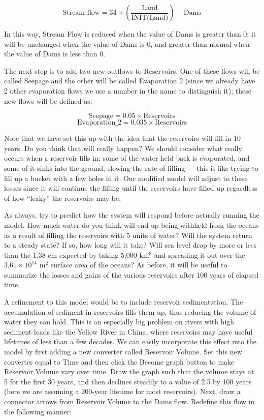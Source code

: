 \documentclass[11pt,letterpaper]{article}
\begin{document}
$$\mbox{Stream flow}=34\times\left(\frac{\mbox{Land}}{\mbox{INIT(Land)}}\right)-\mbox{Dams}$$

In this way, Stream Flow is reduced when the value of Dams is greater than 0; it will be unchanged when the value of Dams is 0, and greater than normal when the value of Dams is less than 0.

The next step is to add two new outflows to Reservoirs. One of these flows will be called Seepage and the other will be called Evaporation 2 (since we already have 2 other evaporation flows we use a number in the name to distinguish it); these new flows will be defined as:

$$\mbox{Seepage} = 0.05\times\mbox{Reservoirs}$$
$$\mbox{Evaporation\_2} = 0.035\times\mbox{Reservoirs}$$ 

Note that we have set this up with the idea that the reservoirs will fill in 10 years. Do you think that will really happen? We should consider what really occurs when a reservoir fills in; some of the water held back is evaporated, and some of it sinks into the ground, slowing the rate of filling --- this is like trying to fill up a bucket with a few holes in it. Our modified model will adjust to these losses since it will continue the filling until the reservoirs have filled up regardless of how ``leaky'' the reservoirs may be.

As always, try to predict how the system will respond before actually running the model. How much water do you think will end up being withheld from the oceans as a result of filling the reservoirs with 5 units of water? Will the system return to a steady state? If so, how long will it take? Will sea level drop by more or less than the 1.38 cm expected by taking 5,000 km$^3$ and spreading it out over the $3.61\times 10^{14}\mbox{ m}^2$ surface area of the oceans? As before, it will be useful to summarize the losses and gains of the various reservoirs after 100 years of elapsed time.

A refinement to this model would be to include reservoir sedimentation. The accumulation of sediment in reservoirs fills them up, thus reducing the volume of water they can hold. This is an especially big problem on rivers with high sediment loads like the Yellow River in China, where reservoirs may have useful lifetimes of less than a few decades. We can easily incorporate this effect into the model by first adding a new converter called Reservoir Volume. Set this new converter equal to Time and then click the Become graph button to make Reservoir Volume vary over time. Draw the graph such that the volume stays at 5 for the first 30 years, and then declines steadily to a value of 2.5 by 100 years (here we are assuming a 200-year lifetime for most reservoirs). Next, draw a connector arrows from Reservoir Volume to the Dams flow. Redefine this flow in the following manner:
\end{document}
